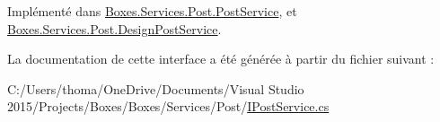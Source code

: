 Implémenté dans \hyperlink{class_boxes_1_1_services_1_1_post_1_1_post_service_a55a2b7e659f9e917de05483b03e8dce8}{Boxes.\+Services.\+Post.\+Post\+Service}, et \hyperlink{class_boxes_1_1_services_1_1_post_1_1_design_post_service_afbd34f884dcc265524f55636448e581b}{Boxes.\+Services.\+Post.\+Design\+Post\+Service}.



La documentation de cette interface a été générée à partir du fichier suivant \+:\begin{DoxyCompactItemize}
\item 
C\+:/\+Users/thoma/\+One\+Drive/\+Documents/\+Visual Studio 2015/\+Projects/\+Boxes/\+Boxes/\+Services/\+Post/\hyperlink{_i_post_service_8cs}{I\+Post\+Service.\+cs}\end{DoxyCompactItemize}
